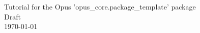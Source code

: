 \documentclass[fleqn]{howto}
\begin{document}
\begin{center}
{\Large Tutorial for the Opus 'opus_core.package_template' package}\\[5mm]
{\large Draft}\\[2mm]
\today
\end{center}
\end{document}
